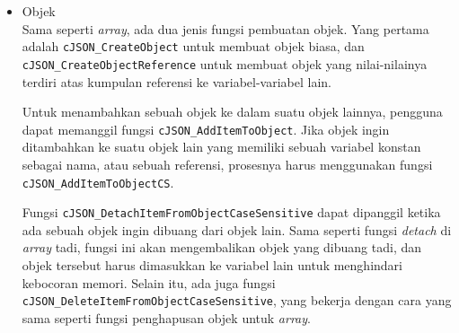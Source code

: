\begin{itemize}[listparindent=\parindent]
	Jika ada sebuah objek yang ingin dihapus dari \textit{array} tertentu, perangkat lunak dapat memanggil fungsi \verb|cJSON_DetachItemFromArray|. Fungsi ini akan mengembalikan objek yang dihapus dari \textit{array} tadi, jadi objek ini harus diberikan ke sebuah penunjuk lainnya (dimasukkan ke dalam variabel lain) agar tidak terjadi kebocoran memori. Selain fungsi tersebut, fungsi \verb|cJSON_DeleteItemFromArray| juga dapat digunakan\textemdash bedanya adalah objek yang dihapus dari \textit{array} tadi, jika dihapus menggunakan fungsi ini, akan langsung dihapus, seakan-akan fungsi \verb|cJSON_Delete| dipanggil untuk objek tersebut.
	\newpage %
	\vspace*{-1.25em} %
	Untuk menimpa/mengganti nilai suatu objek di dalam \textit{array}, fungsi \verb|cJSON_ReplaceItemIn|\linebreak \verb|Array| dapat dipanggil dengan indeks dari objek yang ingin diganti sebagai parameternya. Selain fungsi tersebut, fungsi \verb|cJSON_ReplaceItemViaPointer| juga dapat digunakan\textemdash fungsi ini bekerja dengan memutuskan (\textit{detach}) objek lama yang ingin diganti, menghapus objek tersebut, dan menyisipkan objek yang baru ke tempat objek lama yang sudah dihapus tadi.
	
	Terakhir, untuk mendapatkan objek tertentu dalam \textit{array} berdasarkan indeksnya, \mbox{perangkat} lunak dapat memanggil fungsi \verb|cJSON_GetArrayItem|. Ukuran dari \textit{array}-nya sendiri juga dapat dilihat dengan fungsi \verb|cJSON_GetArraySize|.
	
	\item Objek\\	
	Sama seperti \textit{array}, ada dua jenis fungsi pembuatan objek. Yang pertama adalah \verb|cJSON_Create|\linebreak \verb|Object| untuk membuat objek biasa, dan \verb|cJSON_CreateObjectReference| untuk membuat objek yang nilai-nilainya terdiri atas kumpulan referensi ke variabel-variabel lain.
	
	Untuk menambahkan sebuah objek ke dalam suatu objek lainnya, pengguna dapat \mbox{memanggil} fungsi \verb|cJSON_AddItemToObject|. Jika objek ingin ditambahkan ke suatu \mbox{objek} lain yang memiliki sebuah variabel konstan sebagai nama, atau sebuah referensi, prosesnya harus menggunakan fungsi \verb|cJSON_AddItemToObjectCS|.

	Fungsi \verb|cJSON_DetachItemFromObjectCaseSensitive| dapat dipanggil ketika ada \mbox{sebuah} objek ingin dibuang dari objek lain. Sama seperti fungsi \textit{detach} di \textit{array} tadi, fungsi ini akan mengembalikan objek yang dibuang tadi, dan objek tersebut harus \mbox{dimasukkan} ke variabel lain untuk menghindari kebocoran memori. Selain itu, ada juga fungsi \verb|cJSON_DeleteItemFrom|\linebreak \verb|ObjectCaseSensitive|, yang bekerja dengan cara yang sama seperti fungsi penghapusan objek untuk \textit{array}.


\end{itemize}
